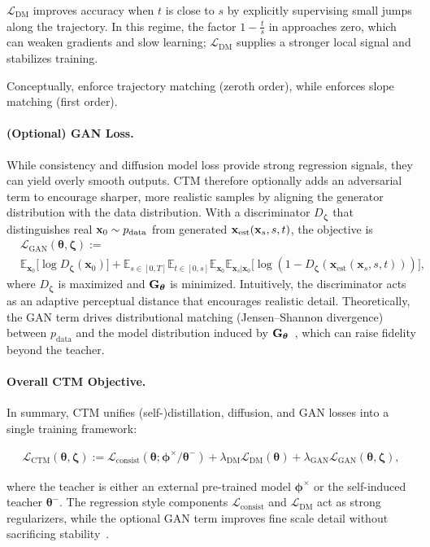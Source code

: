 $\mathcal L_{\mathrm{DM}}$ improves accuracy when $t$ is close to $s$ by explicitly supervising small
jumps along the trajectory. In this regime, the factor $1-\tfrac{t}{s}$ in
 approaches zero, which can weaken gradients and slow
learning; $\mathcal L_{\mathrm{DM}}$ supplies a stronger local signal and stabilizes training.  

Conceptually,  enforce
trajectory matching (zeroth order), while  enforces slope
matching (first order).

\paragraph{(Optional) GAN Loss.}
While consistency and diffusion model loss provide strong regression signals, they can yield
overly smooth outputs. CTM therefore optionally adds an adversarial term to
encourage sharper, more realistic samples by aligning the generator
distribution with the data distribution. With a discriminator
$D_{\bm{\zeta}}$ that distinguishes real ${\mathbf{x}}_{0}\sim p_{\mathrm{data}}$ from
generated ${\mathbf{x}}_{\mathrm{est}}({\mathbf{x}}_{s},s,t)$, the objective is
\begin{align*} 
&\mathcal{L}_{\mathrm{GAN}}(\bm{\theta}, \bm{\zeta}) := \\ &\mathbb{E}_{\mathbf{x}_0} \big[\log D_{\bm{\zeta}}(\mathbf{x}_0)\big] + \mathbb{E}_{s \in [0, T]} \mathbb{E}_{t \in [0, s]} \mathbb{E}_{\mathbf{x}_0} \mathbb{E}_{\mathbf{x}_s \vert \mathbf{x}_0} \big[\log (1 - D_{\bm{\zeta}}( \mathbf{x}_{\mathrm{est}}(\mathbf{x}_s, s, t)))\big], \end{align*}
where $D_{\bm{\zeta}}$ is maximized and ${\mathbf{G}}_{\bm{\theta}}$ is minimized.
Intuitively, the discriminator acts as an adaptive perceptual distance that
encourages realistic detail. Theoretically, the GAN term drives distributional
matching (Jensen–Shannon divergence) between $p_{\mathrm{data}}$ and the model
distribution induced by ${\mathbf{G}}_{\bm{\theta}}$~\citep{goodfellow2014generative},
which can raise fidelity beyond the teacher.

\paragraph{Overall CTM Objective.}
In summary, CTM unifies (self-)distillation, diffusion, and GAN losses into a single training framework:
\begin{mdframed}
    \begin{align*}
\mathcal{L}_{\mathrm{CTM}}(\bm{\theta},\bm{\zeta})
:=  \mathcal{L}_{\mathrm{consist}}(\bm{\theta};  \bm{\phi}^\times/\bm{\theta}^-)
+ \lambda_{\mathrm{DM}} \mathcal{L}_{\mathrm{DM}}(\bm{\theta})
+ \lambda_{\mathrm{GAN}} \mathcal{L}_{\mathrm{GAN}}(\bm{\theta},\bm{\zeta}),
\end{align*}
\end{mdframed}
where the teacher is either an external pre-trained model $\bm{\phi}^\times$ or
the self-induced teacher $\bm{\theta}^-$. The regression style components
$\mathcal{L}_{\mathrm{consist}}$ and $\mathcal{L}_{\mathrm{DM}}$ act as strong
regularizers, while the optional GAN term improves fine scale detail without
sacrificing stability~\citep{kim2024pagoda}.


